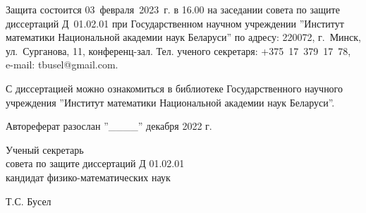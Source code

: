 \documentclass[_00_autoref.tex]{subfiles}
\begin{document}


\medskip
\noindent
Защита состоится 03~февраля~2023~г. в 16.00 на заседании совета по защите диссертаций Д~01.02.01 при Государственном научном учреждении ''Институт математики Национальной академии наук Беларуси'' по адресу: 220072, г.~Минск, ул.~Сурганова, 11, конференц-зал. Тел. ученого секретаря: +375~17~379~17~78, e-mail: tbusel@gmail.com. 

\medskip
\noindent
С диссертацией можно ознакомиться в библиотеке Государственного научного учреждения ''Институт математики Национальной академии наук Беларуси''.

\medskip
\noindent
Автореферат разослан ''\_\_\_\_'' декабря 2022 г.\\

\vfill
\noindent
\begin{minipage}[b]{0.6\textwidth}
    \begin{flushleft}
        Ученый секретарь \\
        совета по защите диссертаций Д 01.02.01 \\
        кандидат физико-математических наук
    \end{flushleft}
\end{minipage}
\begin{minipage}[b]{0.39\textwidth}
    \begin{flushright}
        Т.С. Бусел 
    \end{flushright}
\end{minipage}
\eject

\pagestyle{plain}
\setcounter{page}{1}
\setlength{\voffset}{-8mm}
\end{document}
